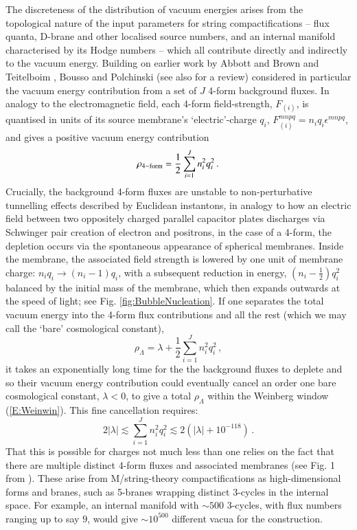 The discreteness of the distribution of vacuum energies arises from the topological nature of the input parameters for string compactifications -- flux quanta, D-brane and other localised source numbers, and an internal manifold characterised by its Hodge numbers -- which all contribute directly and indirectly to the vacuum energy.  Building on earlier work by Abbott \cite{Abbott:1984qf} and Brown and Teitelboim \cite{Brown:1987dd,Brown:1988kg}, Bousso and Polchinski \cite{Bousso:2000xa} (see also \cite{Bousso:2007gp} for a review) considered in particular the vacuum energy contribution from a set of $J$ 4-form background fluxes. In analogy to the electromagnetic field, each 4-form field-strength, $F_{(i)}$, is quantised in units of its source membrane's `electric'-charge $q_i$, $F_{(i)}^{mnpq} = n_i q_i \epsilon^{mnpq}$, and gives a positive vacuum energy contribution
\begin{equation}
\rho_{\rm 4-form} = \frac12 \sum_{i=1}^J n_i^2 q_i^2 \,.
\end{equation}
Crucially, the background 4-form fluxes are unstable to non-perturbative tunnelling effects described by Euclidean instantons, in analogy to how an electric field between two oppositely charged parallel capacitor plates discharges via Schwinger pair creation of electron and positrons, in the case of a 4-form, the depletion occurs via the spontaneous appearance of spherical membranes. Inside the membrane, the associated field strength is lowered by one unit of membrane charge: $n_iq_i \rightarrow (n_i-1)q_i$, with a subsequent reduction in energy, $(n_i-\frac12)q_i^2$ balanced by the initial mass of the membrane, which then expands outwards at the speed of light; see Fig. \ref{fig:BubbleNucleation}.  If one separates the total vacuum energy into the 4-form flux contributions and all the rest (which we may call the `bare' cosmological constant),
\begin{equation}
\rho_{\Lambda} = \lambda + \frac12 \sum_{i=1}^J n_i^2 q_i^2\,,
\end{equation}
it takes an exponentially long time for the
the background fluxes to deplete and so their vacuum energy contribution could eventually cancel an order one bare cosmological constant, $\lambda<0$, to give a total $\rho_\Lambda$ within the Weinberg window (\ref{E:Weinwin}).  This fine cancellation requires:
\begin{equation}
2|\lambda| \lesssim \sum_{i=1}^J n_i^2 q_i^2 \lesssim 2(|\lambda| + 10^{-118})\,.
\end{equation}
That this is possible for charges not much less than one relies on the fact that there are multiple distinct 4-form fluxes and associated membranes (see Fig. 1 from \cite{Bousso:2000xa}). These arise from M/string-theory compactifications as high-dimensional forms and branes, such as 5-branes wrapping distinct 3-cycles in the internal space. For example, an internal manifold with $\sim 500$ 3-cycles, with flux numbers ranging up to say $9$, would give $\sim 10^{500}$ different vacua for the construction. 

